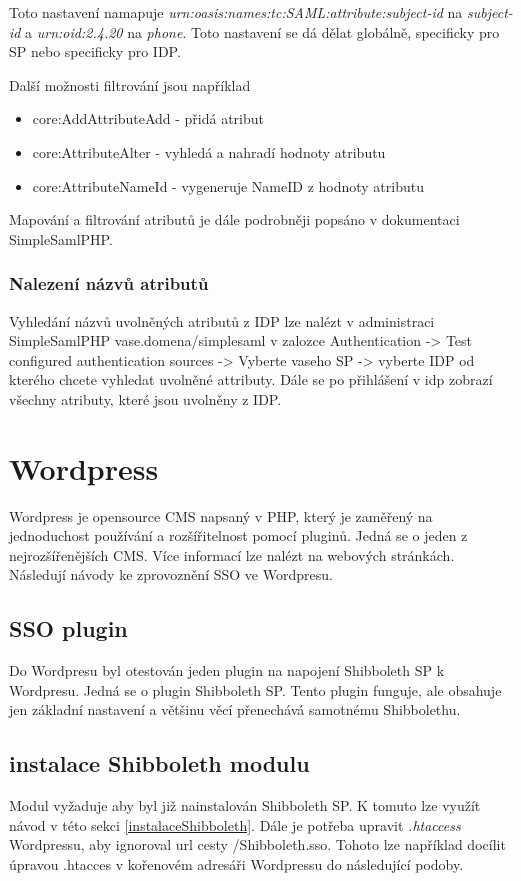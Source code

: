 Toto nastavení namapuje \emph{urn:oasis:names:tc:SAML:attribute:subject-id} na \emph{subject-id} a \emph{urn:oid:2.4.20} na \emph{phone}. Toto nastavení se dá dělat globálně, specificky pro SP nebo specificky pro IDP.

Další možnosti filtrování jsou například
\begin{itemize}
    \item core:AddAttributeAdd - přidá atribut
    \item core:AttributeAlter - vyhledá a nahradí hodnoty atributu
    \item core:AttributeNameId - vygeneruje NameID z hodnoty atributu
\end{itemize}

Mapování a filtrování atributů je dále podrobněji popsáno v dokumentaci SimpleSamlPHP. \cite{Authentication-Processing-Filters-in-SimpleSAMLphp}


\subsubsection{Nalezení názvů atributů} %
Vyhledání názvů uvolněných atributů z IDP lze nalézt v administraci SimpleSamlPHP vase.domena/simplesaml v zalozce Authentication -> Test configured authentication sources -> Vyberte vaseho SP -> vyberte IDP od kterého chcete vyhledat uvolněné attributy. Dále se po přihlášení v idp zobrazí všechny atributy, které jsou uvolněny z IDP.


\section{Wordpress} %

Wordpress je opensource CMS napsaný v PHP, který je zaměřený na jednoduchost používání a rozšířitelnost pomocí pluginů. Jedná se o jeden z nejrozšířenějších CMS. Více informací lze nalézt na webových stránkách\cite{wordpress}.
\\
Následují návody ke zprovoznění SSO ve Wordpresu.

\subsection{SSO plugin} %
Do Wordpresu byl otestován jeden plugin na napojení Shibboleth SP k Wordpresu. Jedná se o plugin Shibboleth SP\cite{ShibbolethSpWp}. Tento plugin funguje, ale obsahuje jen základní nastavení a většinu věcí přenechává samotnému Shibbolethu.

\subsection{instalace Shibboleth modulu} %
Modul vyžaduje aby byl již nainstalován Shibboleth SP. K tomuto lze využít návod v této sekci \ref{instalaceShibboleth}. Dále je potřeba upravit \emph{.htaccess} Wordpressu, aby ignoroval url cesty /Shibboleth.sso. Tohoto lze například docílit úpravou .htacces v kořenovém adresáři Wordpressu do následující podoby.

